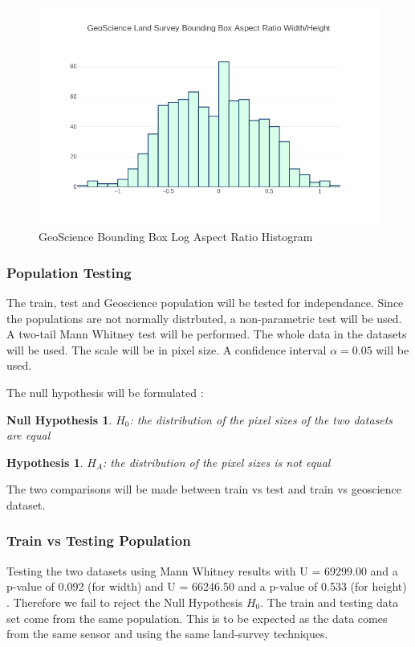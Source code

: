 \documentclass{article}
\newtheorem{hypothesis}{Hypothesis}
\newtheorem{nullhypothesis}{Null Hypothesis}
\begin{document}
\begin{figure}[ht]
\centering
\label{geodroneaspect}
\includegraphics[scale=0.4]{images/geoscience-aspect.png}
\caption{GeoScience Bounding Box Log Aspect Ratio Histogram}
\end{figure}

\subsubsection{Population Testing}

The train, test and Geoscience population will be tested for independance. Since the populations are not normally distrbuted, a non-parametric test will be used. A two-tail Mann Whitney test will be performed. The whole data in the datasets will be used. The scale will be in pixel size. A confidence interval $\alpha = 0.05$ will be used.

The null hypothesis will be formulated :
\begin{nullhypothesis}
$H_0$: the distribution of the pixel sizes of the two datasets are equal
\end{nullhypothesis}
\begin{hypothesis}
$H_{A}$: the distribution of the pixel sizes is not equal
\end{hypothesis}

The two comparisons will be made between train vs test and train vs geoscience dataset.

\subsubsection{Train vs Testing Population}

Testing the two datasets using Mann Whitney results with U = 69299.00 and a p-value of 0.092 (for width) and U = 66246.50 and a p-value of 0.533 (for height) . Therefore we fail to reject the Null Hypothesis $H_0$. The train and testing data set come from the same population. This is to be expected as the data comes from the same sensor and using the same land-survey techniques.
\end{document}
